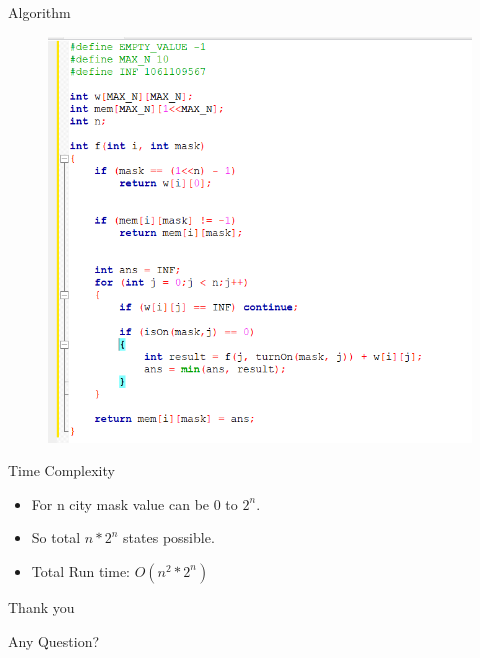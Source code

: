 \documentclass{beamer}
\begin{document}
\begin{frame}{Algorithm}
    \begin{figure}[h]
        \centering
        \includegraphics[scale=0.5]{algo.png}
    \end{figure}
    
\end{frame}

\begin{frame}{Time Complexity}
    \begin{itemize}
        \item<1-> For n city mask value can be 0 to $2^n$.
        \item<2-> So total $n*2^n$ states possible.
        \item<3-> Total Run time: $O(n^2*2^n)$ 
    \end{itemize}
\end{frame}

\begin{frame}
    \begin{center}
        {\Huge Thank you}
    \end{center}
\end{frame}
\begin{frame}
    \begin{center}
        {\Huge Any Question?}
    \end{center}
\end{frame}
\end{document}
